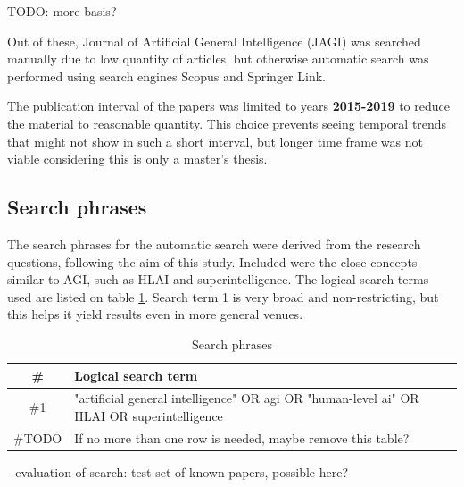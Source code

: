 \documentclass[utf8,english]{gradu3}
\begin{document}
TODO: more basis?


Out of these, Journal of Artificial General
Intelligence (JAGI) was searched manually due to low quantity of articles, but
otherwise automatic search was performed using search engines Scopus and
Springer Link.

The publication interval of the papers was limited to years \textbf{2015-2019}
to reduce the material to reasonable quantity. This choice prevents seeing
temporal trends that might not show in such a short interval, but longer time
frame was not viable considering this is only a master's thesis.

\subsection{Search phrases}

The search phrases for the automatic search were derived from the research
questions, following the aim of this study. Included were the close concepts
similar to AGI, such as HLAI and superintelligence. The logical search terms
used are listed on table \ref{table:search_terms}. Search term 1 is very broad
and non-restricting, but this helps it yield results even in more general
venues.



\begin{table}[h]
  \caption{Search phrases}
  \centering
  \begin{tabular}{| c | p{12cm} |}
    \hline\hline
    \textbf{\#} & \textbf{Logical search term}                                         \\
    \hline
    \#1         & "artificial general intelligence" OR agi OR "human-level ai" OR HLAI
    OR superintelligence                                                               \\
    \hline
    \#TODO      & If no more than one row is needed, maybe remove this table?          \\
    \hline
  \end{tabular}
  \label{table:search_terms}
\end{table}


- evaluation of search: test set of known papers, possible here?
\end{document}
